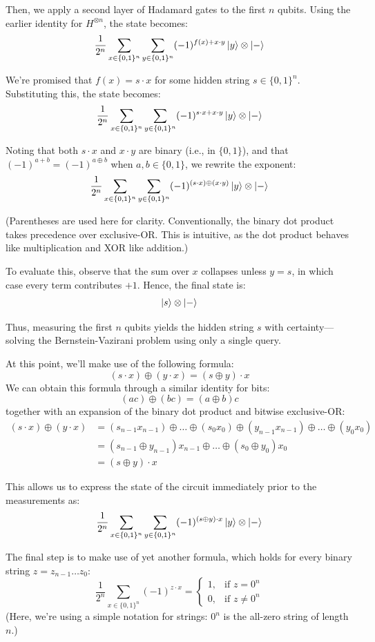 Then, we apply a second layer of Hadamard gates to the first $n$ qubits. Using the earlier identity for $H^{\otimes n}$, the state becomes:
\[
\frac{1}{2^n} \sum_{x \in \{0,1\}^n} \sum_{y \in \{0,1\}^n} (-1)^{f(x) + x \cdot y} \ket{y} \otimes \ket{-}
\]

We're promised that $f(x) = s \cdot x$ for some hidden string $s \in \{0,1\}^n$. Substituting this, the state becomes:
\[
\frac{1}{2^n} \sum_{x \in \{0,1\}^n} \sum_{y \in \{0,1\}^n} (-1)^{s \cdot x + x \cdot y} \ket{y} \otimes \ket{-}
\]

Noting that both $s \cdot x$ and $x \cdot y$ are binary (i.e., in $\{0,1\}$), and that $(-1)^{a + b} = (-1)^{a \oplus b}$ when $a,b \in \{0,1\}$, we rewrite the exponent:
\[
\frac{1}{2^n} \sum_{x \in \{0,1\}^n} \sum_{y \in \{0,1\}^n} (-1)^{(s \cdot x) \oplus (x \cdot y)} \ket{y} \otimes \ket{-}
\]

(Parentheses are used here for clarity. Conventionally, the binary dot product takes precedence over exclusive-OR. This is intuitive, as the dot product behaves like multiplication and XOR like addition.)

To evaluate this, observe that the sum over $x$ collapses unless $y = s$, in which case every term contributes $+1$. Hence, the final state is:
\[
\ket{s} \otimes \ket{-}
\]

Thus, measuring the first $n$ qubits yields the hidden string $s$ with certainty—solving the Bernstein-Vazirani problem using only a single query.


At this point, we'll make use of the following formula:
\[
(s\cdot x)\oplus (y\cdot x) = (s\oplus y)\cdot x
\]
We can obtain this formula through a similar identity for bits:
\[
(ac)\oplus (bc) = (a\oplus b)c
\]
together with an expansion of the binary dot product and bitwise exclusive-OR:
\begin{align*}
    (s\cdot x)\oplus (y\cdot x) &= (s_{n-1}x_{n-1})\oplus \ldots \oplus (s_0x_0) \oplus (y_{n-1}x_{n-1})\oplus \ldots \oplus (y_0x_0)\\
    &= (s_{n-1}\oplus y_{n-1})x_{n-1} \oplus \ldots \oplus (s_0 \oplus y_0)x_0\\
    &= (s\oplus y)\cdot x
\end{align*}

This allows us to express the state of the circuit immediately prior to the measurements as:
\[
\frac{1}{2^n}\sum_{x\in\{0,1\}^n} \sum_{y\in\{0,1\}^n}(-1)^{(s\oplus y)\cdot x} \ket{y}\otimes\ket{-}
\]

The final step is to make use of yet another formula, which holds for every binary string $z = z_{n-1}\ldots z_0$:
\[
\frac{1}{2^n}\sum_{x\in\{0,1\}^n}(-1)^{z\cdot x} =
\begin{cases}
1, &\text{if } z = 0^n \\
0, &\text{if } z \neq 0^n
\end{cases}
\]
(Here, we're using a simple notation for strings: $0^n$ is the all-zero string of length $n$.)

